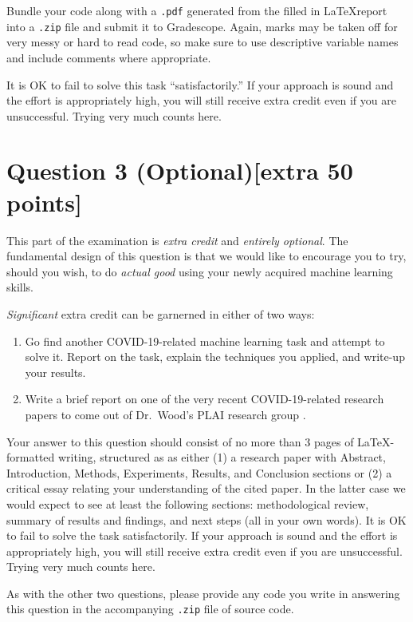 \documentclass{article}
\begin{document}
Bundle your code along with a \texttt{.pdf} generated from the filled in \LaTeX report into a \texttt{.zip} file and submit it to Gradescope. Again, marks may be taken off for very messy or hard to read code, so make sure to use descriptive variable names and include comments where appropriate.

It is OK to fail to solve this task ``satisfactorily.''  If your approach is sound and the effort is appropriately high, you will still receive extra credit even if you are unsuccessful.  Trying very much counts here.

\section*{Question 3 (Optional)\hspace{7cm}[extra 50 points]}
This part of the examination is \emph{extra credit} and \emph{entirely optional}.  The fundamental design of this question is that we would like to encourage you to try, should you wish, to do \emph{actual good} using your newly acquired machine learning skills.  

\emph{Significant} extra credit can be garnerned in either of two ways:

\begin{enumerate}
    \item Go find another COVID-19-related machine learning task and attempt to solve it.  Report on the task, explain the techniques you applied, and write-up your results.  
    \item Write a brief report on one of the very recent COVID-19-related research papers to come out of Dr.~Wood's PLAI research group \citep{wood2020planning}.  
\end{enumerate}

Your answer to this question should consist of no more than 3 pages of \LaTeX-formatted writing, structured as as either (1) a research paper with Abstract, Introduction, Methods, Experiments, Results, and Conclusion sections or (2) a critical essay relating your understanding of the cited paper.  In the latter case we would expect to see at least the following sections: methodological review, summary of results and findings, and next steps (all in your own words).  It is OK to fail to solve the task satisfactorily.  If your approach is sound and the effort is appropriately high, you will still receive extra credit even if you are unsuccessful.  Trying very much counts here.

As with the other two questions, please provide any code you write in answering this question in the accompanying \texttt{.zip} file of source code.
\end{document}
